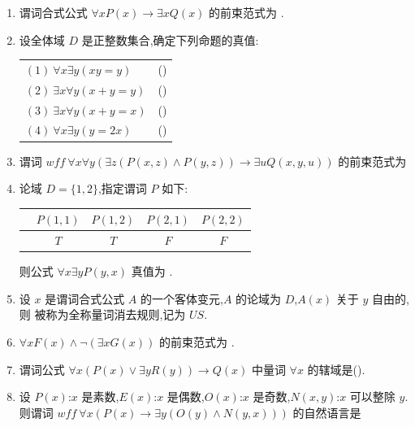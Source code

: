 \begin{enumerate}
	
	\item 谓词合式公式 \(\forall xP(x)\to \exists xQ(x)\) 的前束范式为 \underline{\hspace{6cm}}.
	
	\item 设全体域 \(D\) 是正整数集合,确定下列命题的真值:
	
	\begin{tabular}{ll}
		\((1)\ \forall x\exists y(xy=y)\) & (\quad) \\
		\((2)\ \exists x\forall y(x+y=y)\) & (\quad) \\
		\((3)\ \exists x\forall y(x+y=x)\) & (\quad) \\
		\((4)\ \forall x\exists y(y=2x)\) & (\quad)
	\end{tabular}
	
	
	\item 谓词 \(wff\ \forall x\forall y(\exists z(P(x,z)\land P(y,z))\to \exists uQ(x,y,u))\) 的前束范式为

	
	\item 论域 \(D=\{1,2\}\),指定谓词 \(P\) 如下:
	
	\begin{center}
		\begin{tabular}{c|cccc}
			& \(P(1,1)\) & \(P(1,2)\) & \(P(2,1)\) & \(P(2,2)\) \\
			\hline
			& \(T\) & \(T\) & \(F\) & \(F\)
		\end{tabular}
	\end{center}
	
	则公式 \(\forall x\exists yP(y,x)\) 真值为 \underline{\hspace{5cm}}.
	
	\item 设 \(x\) 是谓词合式公式 \(A\) 的一个客体变元,\(A\) 的论域为 \(D\),\(A(x)\) 关于 \(y\) 自由的,则 \underline{\hspace{6cm}} 被称为全称量词消去规则,记为 \(US\).
	
	\item \(\forall xF(x)\land \neg(\exists xG(x))\) 的前束范式为 \underline{\hspace{6cm}}.
	
	\item 谓词公式 \(\forall x(P(x)\vee \exists yR(y))\to Q(x)\) 中量词 \(\forall x\) 的辖域是(\quad).
	
	
	\item 设 \(P(x)\):\(x\) 是素数,\(E(x)\):\(x\) 是偶数,\(O(x)\):\(x\) 是奇数,\(N(x,y)\):\(x\) 可以整除 \(y\).则谓词 \(wff\ \forall x(P(x)\to \exists y(O(y)\land N(y,x)))\) 的自然语言是
	
\end{enumerate}


